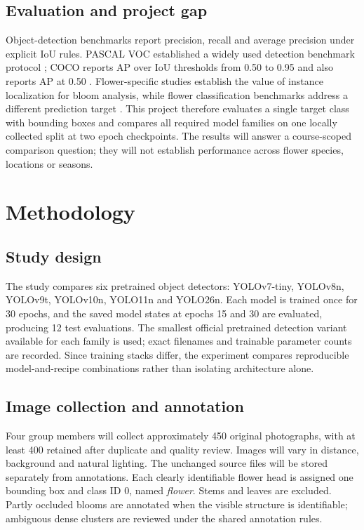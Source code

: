 \documentclass[conference]{IEEEtran}
\begin{document}
\subsection{Evaluation and project gap}
Object-detection benchmarks report precision, recall and average precision under explicit IoU rules. PASCAL VOC established a widely used detection benchmark protocol \cite{everingham2010voc}; COCO reports AP over IoU thresholds from 0.50 to 0.95 and also reports AP at 0.50 \cite{lin2014coco}. Flower-specific studies establish the value of instance localization for bloom analysis, while flower classification benchmarks address a different prediction target \cite{nilsback2008classification,jiang2020deepflower,yu2024ynu}. This project therefore evaluates a single target class with bounding boxes and compares all required model families on one locally collected split at two epoch checkpoints. The results will answer a course-scoped comparison question; they will not establish performance across flower species, locations or seasons.

\section{Methodology}
\subsection{Study design}
The study compares six pretrained object detectors: YOLOv7-tiny, YOLOv8n, YOLOv9t, YOLOv10n, YOLO11n and YOLO26n. Each model is trained once for 30 epochs, and the saved model states at epochs 15 and 30 are evaluated, producing 12 test evaluations. The smallest official pretrained detection variant available for each family is used; exact filenames and trainable parameter counts are recorded. Since training stacks differ, the experiment compares reproducible model-and-recipe combinations rather than isolating architecture alone.

\subsection{Image collection and annotation}
Four group members will collect approximately 450 original photographs, with at least 400 retained after duplicate and quality review. Images will vary in distance, background and natural lighting. The unchanged source files will be stored separately from annotations. Each clearly identifiable flower head is assigned one bounding box and class ID 0, named \emph{flower}. Stems and leaves are excluded. Partly occluded blooms are annotated when the visible structure is identifiable; ambiguous dense clusters are reviewed under the shared annotation rules.
\end{document}
